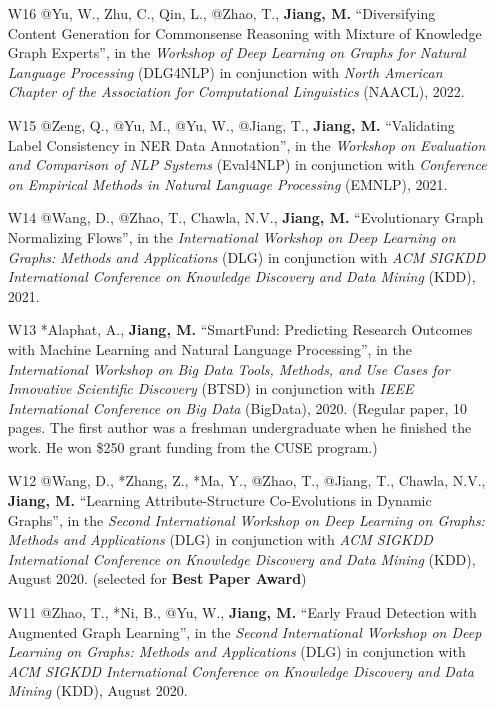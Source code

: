 \documentclass[10pt]{article}
\newenvironment{myindentpar}[1]%
{\begin{list}{}%
         {\setlength{\leftmargin}{#1}}%
         \item[]%
}
{\end{list}}
\newcounter{list}
\begin{document}
\begin{myindentpar}{0.00cm}
\begin{enumerate}[leftmargin=.5cm]
\item[W16] @Yu, W., Zhu, C., Qin, L., @Zhao, T., \textbf{Jiang, M.} ``Diversifying Content Generation for Commonsense Reasoning with Mixture of Knowledge Graph Experts'', in the \textit{Workshop of Deep Learning on Graphs for Natural Language Processing} (DLG4NLP) in conjunction with \textit{North American Chapter of the Association for Computational Linguistics} (NAACL), 2022.
		
\item[W15] @Zeng, Q., @Yu, M., @Yu, W., @Jiang, T., \textbf{Jiang, M.} ``Validating Label Consistency in NER Data Annotation'', in the \textit{Workshop on Evaluation and Comparison of NLP Systems} (Eval4NLP) in conjunction with \textit{Conference on Empirical Methods in Natural Language Processing} (EMNLP), 2021.

\item[W14] @Wang, D., @Zhao, T., Chawla, N.V., \textbf{Jiang, M.} ``Evolutionary Graph Normalizing Flows'', in the \textit{International Workshop on Deep Learning on Graphs: Methods and Applications} (DLG) in conjunction with \textit{ACM SIGKDD International Conference on Knowledge Discovery and Data Mining} (KDD), 2021.

\item[W13] *Alaphat, A., \textbf{Jiang, M.} ``SmartFund: Predicting Research Outcomes with Machine Learning and Natural Language Processing'', in the \textit{International Workshop on Big Data Tools, Methods, and Use Cases for Innovative Scientific Discovery} (BTSD) in conjunction with \textit{IEEE International Conference on Big Data} (BigData), 2020. (Regular paper, 10 pages. The first author was a freshman undergraduate when he finished the work. He won \$250 grant funding from the CUSE program.)

\item[W12] @Wang, D., *Zhang, Z., *Ma, Y., @Zhao, T., @Jiang, T., Chawla, N.V., \textbf{Jiang, M.} ``Learning Attribute-Structure Co-Evolutions in Dynamic Graphs'', in the \textit{Second International Workshop on Deep Learning on Graphs: Methods and Applications} (DLG) in conjunction with \textit{ACM SIGKDD International Conference on Knowledge Discovery and Data Mining} (KDD), August 2020. (selected for \textbf{Best Paper Award})

\item[W11] @Zhao, T., *Ni, B., @Yu, W., \textbf{Jiang, M.} ``Early Fraud Detection with Augmented Graph Learning'', in the \textit{Second International Workshop on Deep Learning on Graphs: Methods and Applications} (DLG) in conjunction with \textit{ACM SIGKDD International Conference on Knowledge Discovery and Data Mining} (KDD), August 2020.


\end{enumerate}
\end{myindentpar}
\end{document}
